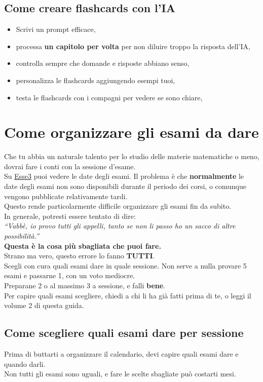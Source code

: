\documentclass[18pt]{extarticle}
\begin{document}
\subsection{Come creare flashcards con l'IA}
\begin{itemize}
\item Scrivi un prompt efficace,
\item processa \textbf{un capitolo per volta} per non diluire troppo la risposta dell'IA,
\item controlla sempre che domande e risposte abbiano senso,
\item personalizza le flashcards aggiungendo esempi tuoi,
\item testa le flashcards con i compagni per vedere se sono chiare,
\end{itemize}


\section{Come organizzare gli esami da dare}
Che tu abbia un naturale talento per lo studio delle materie matematiche o meno, dovrai fare i conti con la sessione d'esame.\\
Su \href{https://uniud.esse3.cineca.it/Home.do}{Esse3} puoi vedere le date degli esami. Il problema è che \textbf{normalmente} le date degli esami non sono disponibili durante il periodo dei corsi, o comunque vengono pubblicate relativamente tardi.\\
Questo rende particolarmente difficile organizzare gli esami fin da subito.\\
In generale, potresti essere tentato di dire:\\
\textit{``Vabbè, io provo tutti gli appelli, tanto se non li passo ho un sacco di altre possibilità.''}\\
\textbf{Questa è la cosa più sbagliata che puoi fare.}\\
Strano ma vero, questo errore lo fanno \textbf{TUTTI}.\\
Scegli con cura quali esami dare in quale sessione. Non serve a nulla provare 5 esami e passarne 1, con un voto mediocre.\\
Preparane 2 o al massimo 3 a sessione, e falli \textbf{bene}.\\
Per capire quali esami scegliere, chiedi a chi li ha già fatti prima di te, o leggi il volume 2 di questa guida.


\subsection{Come scegliere quali esami dare per sessione}
Prima di buttarti a organizzare il calendario, devi capire quali esami dare e quando darli.\\
Non tutti gli esami sono uguali, e fare le scelte sbagliate può costarti mesi.
\end{document}
